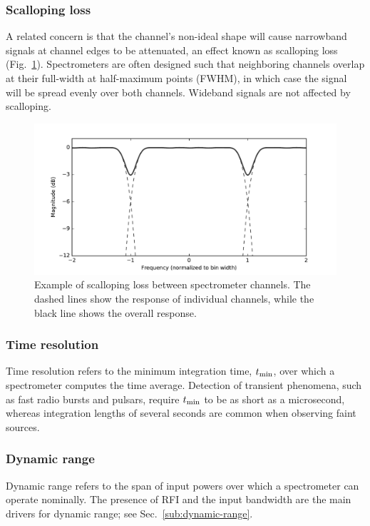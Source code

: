 \documentclass{ws-rv961x669}
\begin{document}
\subsubsection{Scalloping loss} 

A related concern is that the channel's non-ideal shape will cause narrowband signals at channel edges to be attenuated, an effect known as scalloping loss (Fig.~\ref{fig:scalloping}). Spectrometers are often designed such that neighboring channels overlap at their full-width at half-maximum points (FWHM), in which case the signal will be spread evenly over both channels. Wideband signals are not affected by scalloping. 

\begin{figure}
 \centering
 \includegraphics[width=\textwidth]{./figures/pfb_scalloping}
 \caption{Example of scalloping loss between spectrometer channels. The dashed lines show the response of individual channels, while the black line shows the overall response.\label{fig:scalloping}}
\end{figure}

\subsubsection{Time resolution} 

Time resolution refers to the minimum integration time, $t_{\rm{min}}$, over which a spectrometer computes the time average. Detection of transient phenomena, such as fast radio bursts %
 and pulsars, require $t_{\rm{min}}$ to be as short as a microsecond, whereas integration lengths of several seconds are common when observing faint sources.  %

\subsubsection{Dynamic range}
Dynamic range refers to the span of input powers over which a spectrometer can operate nominally. The presence of RFI and the input bandwidth are the main drivers for dynamic range; see Sec.~\ref{sub:dynamic-range}.
\end{document}
